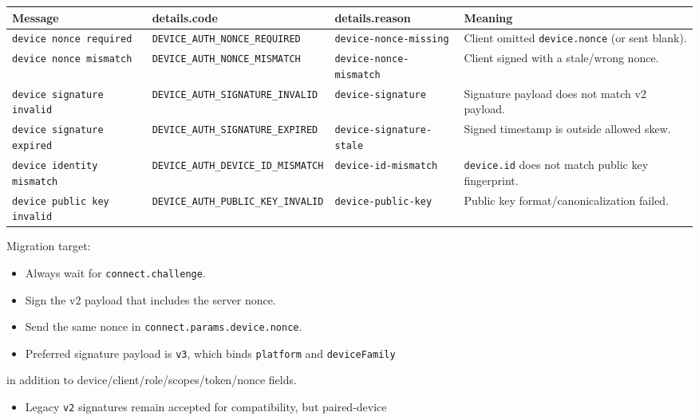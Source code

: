 \begin{table}[h]
\centering
\small
\begin{tabular}{|l|l|l|l|}
\hline
Message & details.code & details.reason & Meaning \\
\hline
\texttt{device nonce required} & \texttt{DEVICE\_AUTH\_NONCE\_REQUIRED} & \texttt{device-nonce-missing} & Client omitted \texttt{device.nonce} (or sent blank). \\
\hline
\texttt{device nonce mismatch} & \texttt{DEVICE\_AUTH\_NONCE\_MISMATCH} & \texttt{device-nonce-mismatch} & Client signed with a stale/wrong nonce. \\
\hline
\texttt{device signature invalid} & \texttt{DEVICE\_AUTH\_SIGNATURE\_INVALID} & \texttt{device-signature} & Signature payload does not match v2 payload. \\
\hline
\texttt{device signature expired} & \texttt{DEVICE\_AUTH\_SIGNATURE\_EXPIRED} & \texttt{device-signature-stale} & Signed timestamp is outside allowed skew. \\
\hline
\texttt{device identity mismatch} & \texttt{DEVICE\_AUTH\_DEVICE\_ID\_MISMATCH} & \texttt{device-id-mismatch} & \texttt{device.id} does not match public key fingerprint. \\
\hline
\texttt{device public key invalid} & \texttt{DEVICE\_AUTH\_PUBLIC\_KEY\_INVALID} & \texttt{device-public-key} & Public key format/canonicalization failed. \\
\hline
\end{tabular}
\end{table}



Migration target:

\begin{itemize}
  \item Always wait for \texttt{connect.challenge}.
  \item Sign the v2 payload that includes the server nonce.
  \item Send the same nonce in \texttt{connect.params.device.nonce}.
  \item Preferred signature payload is \texttt{v3}, which binds \texttt{platform} and \texttt{deviceFamily}
\end{itemize}

in addition to device/client/role/scopes/token/nonce fields.
\begin{itemize}
  \item Legacy \texttt{v2} signatures remain accepted for compatibility, but paired-device
\end{itemize}

